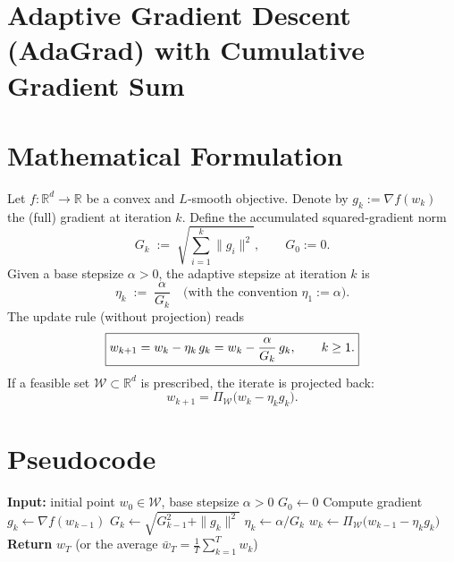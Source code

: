 \documentclass{article}
\begin{document}
\section*{Adaptive Gradient Descent (AdaGrad) with Cumulative Gradient Sum}

\section*{Mathematical Formulation}
Let $f:\mathbb{R}^d\rightarrow\mathbb{R}$ be a convex and $L$‑smooth objective.
Denote by $g_k:=\nabla f(w_k)$ the (full) gradient at iteration $k$.
Define the accumulated squared‑gradient norm
\[
G_k \;:=\;\sqrt{\sum_{i=1}^{k}\|g_i\|^2},\qquad G_0:=0 .
\]
Given a base stepsize $\alpha>0$, the adaptive stepsize at iteration $k$ is
\[
\eta_k \;:=\;\frac{\alpha}{G_k}\quad\text{(with the convention }\eta_1:=\alpha\text{)} .
\]
The update rule (without projection) reads
\begin{equation}
\boxed{%
w_{k+1}= w_k-\eta_k\,g_k
      = w_k-\frac{\alpha}{G_k}\,g_k ,\qquad k\ge 1.}
\label{eq:update}
\end{equation}
If a feasible set $\mathcal{W}\subset\mathbb{R}^d$ is prescribed,
the iterate is projected back:
\[
w_{k+1}= \Pi_{\mathcal{W}}\!\bigl(w_k-\eta_k g_k\bigr).
\]

\section*{Pseudocode}
\begin{algorithm}[H]
\caption{AdaGrad with cumulative gradient sum}
\label{alg:adagrad}
\begin{algorithmic}[1]
\STATE \textbf{Input:} initial point $w_0\in\mathcal{W}$, base stepsize $\alpha>0$
\STATE $G_0\gets 0$
    \STATE Compute gradient $g_k \gets \nabla f(w_{k-1})$
    \STATE $G_k \gets \sqrt{G_{k-1}^2+\|g_k\|^{2}}$
    \STATE $\eta_k \gets \alpha / G_k$   
    \STATE $w_k \gets \Pi_{\mathcal{W}}\bigl(w_{k-1}-\eta_k g_k\bigr)$
\ENDFOR
\STATE \textbf{Return} $w_T$ (or the average $\bar w_T=\frac1T\sum_{k=1}^{T}w_k$)
\end{algorithmic}
\end{algorithm}
\end{document}
